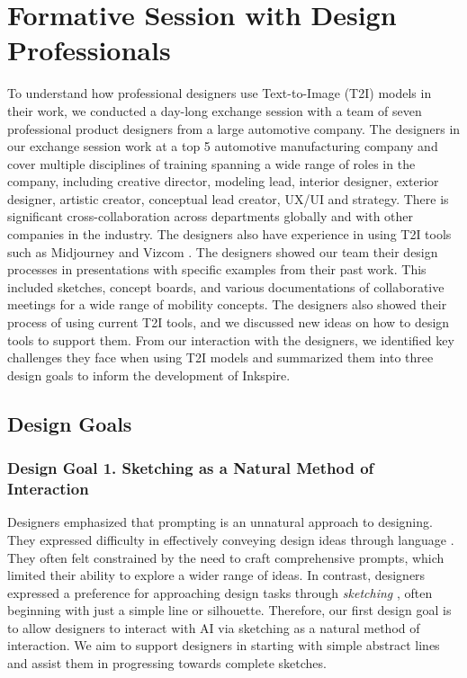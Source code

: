 \documentclass[sigconf, screen]{acmart}
\begin{document}


\section{Formative Session with Design Professionals}

To understand how professional designers use Text-to-Image (T2I) models in their work, we conducted a day-long exchange session with a team of seven professional product designers from a large automotive company.
The designers in our exchange session work at a top 5 automotive manufacturing company and 
cover multiple disciplines of training spanning a wide range of roles in the company, including creative director, modeling lead, interior designer, exterior designer, artistic creator, conceptual lead creator, UX/UI and strategy.
There is significant cross-collaboration across departments globally and with other companies in the industry.
The designers also have experience in using T2I tools such as Midjourney \cite{midjourney} and Vizcom \cite{vizcom}.
The designers showed our team their design processes in presentations with specific examples from their past work. This included sketches, concept boards, and various documentations of collaborative meetings for a wide range of mobility concepts. The designers also showed their process of using current T2I tools, and we discussed new ideas on how to design tools to support them.
From our interaction with the designers, we identified key challenges they face when using T2I models and summarized them into three design goals to inform the development of Inkspire.

\subsection{Design Goals}

\subsubsection{Design Goal 1. Sketching as a Natural Method of Interaction}

Designers emphasized that prompting is an unnatural approach to designing. They expressed difficulty in effectively conveying design ideas through language \cite{zamfirescu2023johnny}. They often felt constrained by the need to craft comprehensive prompts, which limited their ability to explore a wider range of ideas. In contrast, designers expressed a preference for approaching design tasks through \textit{sketching} \cite{buxton2010sketching}, often beginning with just a simple line or silhouette. Therefore, our first design goal is to allow designers to interact with AI via sketching as a natural method of interaction. We aim to support designers in starting with simple abstract lines and assist them in progressing towards complete sketches.
\end{document}
